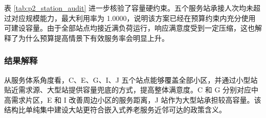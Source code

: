 表 \ref{tab:p2_station_audit} 进一步核验了容量硬约束。五个服务站承接人次均未超过对应规模能力，最大利用率为 1.0000，说明该方案已经在预算约束内充分使用可建设容量。由于全部站点均接近满负荷运行，响应满意度受到一定压缩，这也解释了为什么预算提高情景下有效服务率会明显上升。

\subsubsection{结果解释}

从服务体系角度看，C、E、G、I、J 五个站点能够覆盖全部小区，并通过小型站贴近需求源、大型站提供容量兜底的方式，提高整体满意度。C 和 G 分别对应中高需求片区，E 和 I 改善周边小区的服务距离，J 站作为大型站承担较高容量。该结构比单纯集中建设大站更符合嵌入式养老服务近邻可达的政策含义。